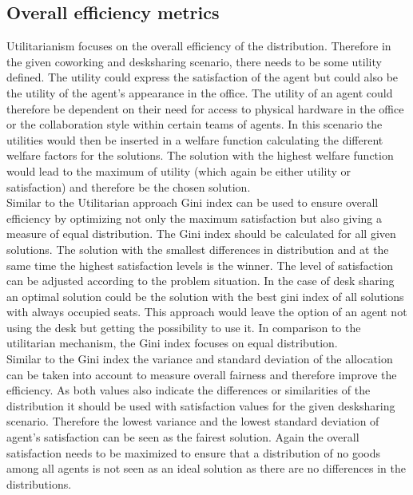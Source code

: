 \documentclass[german, a4paper, 11pt, oneside]{scrbook}
\begin{document}
\subsection{Overall efficiency metrics}
Utilitarianism focuses on the overall efficiency of the distribution. Therefore in the given coworking and desksharing scenario, there needs to be some utility defined. The utility could express the satisfaction of the agent but could also be the utility of the agent's appearance in the office. The utility of an agent could therefore be dependent on their need for access to physical hardware in the office or the collaboration style within certain teams of agents. In this scenario the utilities would then be inserted in a welfare function calculating the different welfare factors for the solutions. The solution with the highest welfare function would lead to the maximum of utility (which again be either utility or satisfaction) and therefore be the chosen solution. \\Similar to the Utilitarian approach Gini index can be used to ensure overall efficiency by optimizing not only the maximum satisfaction but also giving a measure of equal distribution. The Gini index should be calculated for all given solutions. The solution with the smallest differences in distribution and at the same time the highest satisfaction levels is the winner. The level of satisfaction can be adjusted according to the problem situation. In the case of desk sharing an optimal solution could be the solution with the best gini index of all solutions with always occupied seats. This approach would leave the option of an agent not using the desk but getting the possibility to use it. In comparison to the utilitarian mechanism, the Gini index focuses on equal distribution.
\\Similar to the Gini index the variance and standard deviation of the allocation can be taken into account to measure overall fairness and therefore improve the efficiency. As both values also indicate the differences or similarities of the distribution it should be used with satisfaction values for the given desksharing scenario. Therefore the lowest variance and the lowest standard deviation of agent's satisfaction can be seen as the fairest solution. Again the overall satisfaction needs to be maximized to ensure that a distribution of no goods among all agents is not seen as an ideal solution as there are no differences in the distributions.
\end{document}
